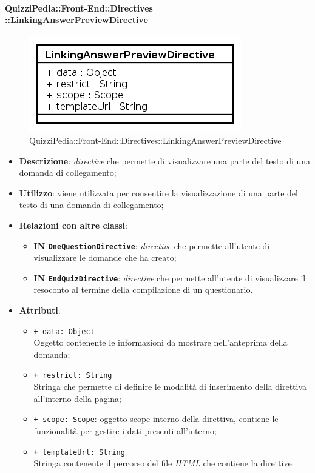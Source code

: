 	\paragraph{QuizziPedia::Front-End::Directives\\::LinkingAnswerPreviewDirective}
		
		\label{QuizziPedia::Front-End::Directives::LinkingAnswerPreviewDirective}
		
		\begin{figure}[ht]
			\centering
			\includegraphics[scale=0.80,keepaspectratio]{UML/Classi/Front-End/QuizziPedia_Front-end_Directives_LinkingAnswerPreviewDirective.png}
			\caption{QuizziPedia::Front-End::Directives::LinkingAnswerPreviewDirective}
		\end{figure} \FloatBarrier
		
		\begin{itemize}
			\item \textbf{Descrizione}: \textit{directive} che permette di visualizzare una parte del testo di una domanda di collegamento;
			\item \textbf{Utilizzo}: viene utilizzata per consentire la visualizzazione di una parte del testo di una domanda di collegamento;
			\item \textbf{Relazioni con altre classi}: 
			\begin{itemize}
				\item \textbf{IN \texttt{OneQuestionDirective}}: \textit{directive} che permette all'utente di visualizzare le domande che ha creato;
				\item \textbf{IN \texttt{EndQuizDirective}}: \textit{directive} che permette all'utente di visualizzare il resoconto al termine della compilazione di un questionario.
			\end{itemize}
			\item \textbf{Attributi}:
			\begin{itemize}
				\item \texttt{+ data: Object} \\ Oggetto contenente le informazioni da mostrare nell'anteprima della domanda;
		\item \texttt{+ restrict: String} \\ Stringa che permette di definire le modalità di inserimento della direttiva all'interno della pagina;
		\item \texttt{+ scope: Scope}: oggetto scope interno della direttiva, contiene le funzionalità per gestire i dati presenti all'interno;
		\item \texttt{+ templateUrl: String} \\ Stringa contenente il percorso del file \textit{HTML} che contiene la direttive.
			\end{itemize}
		\end{itemize}